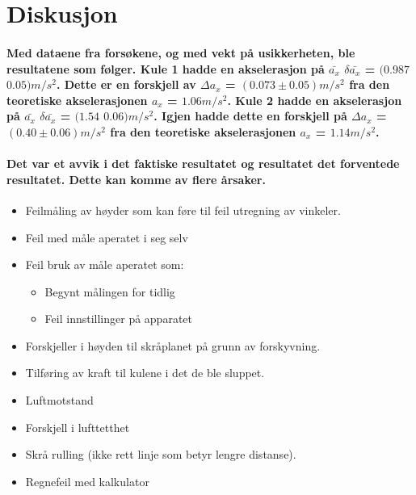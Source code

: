 \documentclass[12pt]{article}
\begin{document}
\section{Diskusjon}

\paragraph{Med dataene fra forsøkene, og med vekt på usikkerheten, ble resultatene som følger. Kule 1 hadde en akselerasjon på $\bar{a_x}$ \pm $\delta \bar{a_x}$ = $(0.987$ \pm $ 0.05)m/s^2$. Dette er en forskjell av $\Delta {a_x}$ = $(0.073 \pm 0.05)m/s^2$ fra den teoretiske akselerasjonen $a_x$ =  $1.06 m/s^2$. Kule 2 hadde en akselerasjon på $\bar{a_x}$ \pm $\delta \bar{a_x}$ = $(1.54$ \pm $ 0.06)m/s^2$. Igjen hadde dette en forskjell på $\Delta {a_x}$ = $(0.40 \pm 0.06)m/s^2$ fra den teoretiske akselerasjonen $a_x$ = $1.14 m/s^2$.}

\paragraph{Det var et avvik i det faktiske resultatet og resultatet det forventede resultatet. Dette kan komme av flere årsaker.}

\begin{itemize}
    \item Feilmåling av høyder som kan føre til feil utregning av vinkeler.
    \item Feil med måle aperatet i seg selv
    \item Feil bruk av måle aperatet som:
        \begin{itemize}
            \item Begynt målingen for tidlig
            \item Feil innstillinger på apparatet
        \end{itemize}
    \item Forskjeller i høyden til skråplanet på grunn av forskyvning.
    \item Tilføring av kraft til kulene i det de ble sluppet.
    \item Luftmotstand
    \item Forskjell i lufttetthet
    \item Skrå rulling (ikke rett linje som betyr lengre distanse).
    \item Regnefeil med kalkulator
\end{itemize}
\end{document}
